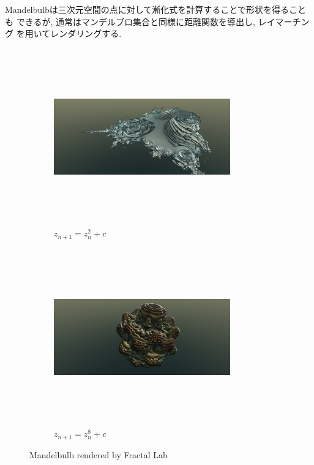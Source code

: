Mandelbulbは三次元空間の点に対して漸化式を計算することで形状を得ることも
できるが, 通常はマンデルブロ集合と同様に距離関数を導出し, レイマーチング
を用いてレンダリングする.

\begin{figure}[h!tbp]
 \begin{subfigure}{0.49\hsize}
   \begin{center}
    \includegraphics[width=3in, height=3in, keepaspectratio]{../img/fractal/mandelbulb2.pdf}
    \caption{$z_{n + 1} = z_n^2 + c$}
    \label{fig:mandelbulb2}
   \end{center}
 \end{subfigure}
 \hspace*{\fill}
 \begin{subfigure}{0.49\hsize}
   \begin{center}
    \includegraphics[width=3in, height=3in, keepaspectratio]{../img/fractal/mandelbulb8.pdf}
    \caption{$z_{n+1} = z_n^8 + c$}
    \label{fig:mandelbulb8}
   \end{center}
 \end{subfigure}
 \caption{Mandelbulb rendered by Fractal Lab}
\end{figure}

